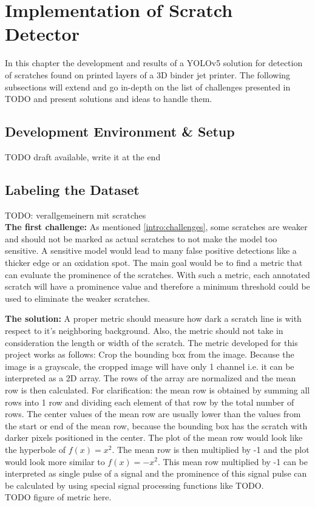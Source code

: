 \section{Implementation of Scratch Detector}
In this chapter the development and results of a YOLOv5 solution for detection of scratches found on printed layers of a 3D binder jet printer. The following subsections will extend and go in-depth on the list of challenges presented in TODO and present solutions and ideas to handle them.

\subsection{Development Environment \& Setup}
TODO draft available, write it at the end

\subsection{Labeling the Dataset}
TODO: verallgemeinern mit scratches \\

\textbf{The first challenge:}
As mentioned \ref{intro:challenges}, some scratches are weaker and should not be marked as actual scratches to not make the model too sensitive. A sensitive model would lead to many false positive detections like a thicker edge or an oxidation spot. The main goal would be to find a metric that can evaluate the prominence of the scratches. With such a metric, each annotated scratch will have a prominence value and therefore a minimum threshold could be used to eliminate the weaker scratches.

\textbf{The solution:}
A proper metric should measure how dark a scratch line is with respect to it's neighboring background. Also, the metric should not take in consideration the length or width of the scratch.
The metric developed for this project works as follows:
Crop the bounding box from the image. Because the image is a grayscale, the cropped image will have only 1 channel i.e. it can be interpreted as a 2D array. The rows of the array are normalized and the mean row is then calculated. For clarification: the mean row is obtained by summing all rows into 1 row and dividing each element of that row by the total number of rows. The center values of the mean row are usually lower than the values from the start or end of the mean row, because the bounding box has the scratch with darker pixels positioned in the center. The plot of the mean row would look like the hyperbole of $f(x)=x^2$. The mean row is then multiplied by -1 and the plot would look more similar to $f(x)=-x^2$. This mean row multiplied by -1 can be interpreted as single pulse of a signal and the prominence of this signal pulse can be calculated by using special signal processing functions like TODO. \\
TODO figure of metric here. \\

